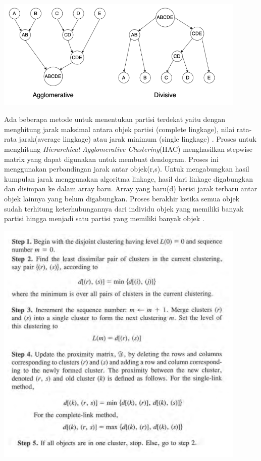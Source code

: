 \begin{enumerate}[leftmargin=1.3cm]
	\begin{center}
		\includegraphics[width=12cm]{img/bab_2/agVSDiv.png}
		\label{fig:asd}
	\end{center}

	Ada beberapa metode untuk menentukan partisi terdekat yaitu dengan menghitung jarak maksimal antara objek partisi (complete lingkage), nilai rata-rata jarak(average lingkage) atau jarak minimum (single lingkage) \cite{3D3}. Proses untuk menghitung \textit{Hierarchical Agglomerative Clustering}(HAC) menghasilkan stepwise matrix yang dapat digunakan untuk membuat dendogram. Proses ini menggunakan perbandingan jarak antar objek(r,s). Untuk mengabungkan hasil kumpulan jarak menggunakan algoritma linkage, hasil dari linkage digabungkan dan disimpan ke dalam array baru. Array yang baru(d) berisi jarak terbaru antar objek lainnya yang belum digabungkan. Proses berakhir ketika semua objek sudah terhitung keterhubungannya dari individu objek yang memiliki banyak partisi hingga menjadi satu partisi yang memiliki banyak objek \cite{2C9}.
	
	\begin{center}
		\includegraphics[width=12cm]{img/bab_2/algo_hac.png}
		\label{fig:algo_hac}
	\end{center}


\end{enumerate}
